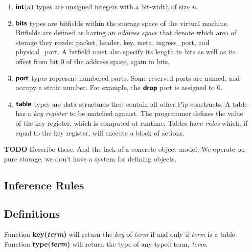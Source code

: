 \begin{enumerate}
\item $\bm{\mathsf{{int}}}(n)$ types are unsigned integers with a bit-width of size \textit{n}.
\item $\bm{\mathsf{{bits}}}$ types are bitfields within the storage space of the virtual machine. Bitfields are defined as having an \textit{address space} that denote which area of storage they reside: packet, header, key, meta, ingress\_port, and physical\_port. A bitfield must also specify its length in bits as well as its offset from bit 0 of the address space, again in bits.
\item $\bm{\mathsf{{port}}}$ types represent numbered ports. Some reserved ports are named, and occupy a static number. For example, the $\bm{\mathsf{{drop}}}$ port is assigned to 0.
\item $\bm{\mathsf{{table}}}$ types are data structures that contain all other Pip constructs. A table has a \textit{key register} to be matched against. The programmer defines the value of the key register, which is computed at runtime. Tables have \textit{rules} which, if equal to the key register, will execute a block of actions.
\end{enumerate}

\textbf{TODO} Describe these. And the lack of a concrete object model. We
operate on pure storage, we don't have a system for defining objects.

\subsection{Inference Rules}
\subsection*{Definitions}
Function \textbf{key(\textit{term})} will return the \textit{key} of \textit{term} if and only if \textit{term} is a table. \\
Function \textbf{type(\textit{term})} will return the type of any typed term, \textit{term}.


